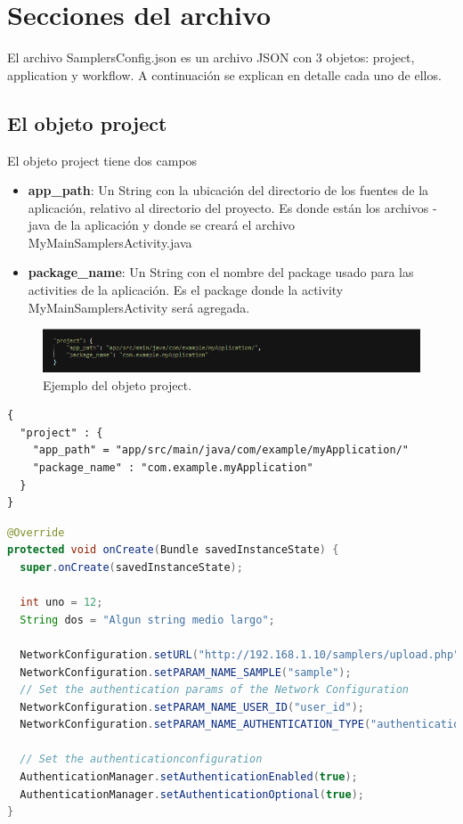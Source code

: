 \section{Secciones del archivo} \label{sec:archivo_config_detallado}

El archivo SamplersConfig.json es un archivo JSON con 3 objetos: project, application y workflow. A continuación se explican en detalle cada uno de ellos.

\subsection{El objeto project}
		
	El objeto project tiene dos campos
	\begin{itemize}
		\item \textbf{app\_path}: Un String con la ubicación del directorio de los fuentes de la aplicación, relativo al directorio del proyecto. Es donde están los archivos -java de la aplicación y donde se creará el archivo MyMainSamplersActivity.java
		\item \textbf{package\_name}: Un String con el nombre del package usado para las activities de la aplicación. Es el package donde la activity MyMainSamplersActivity será agregada.
	\end{itemize}
	
\begin{figure}[H]
  \centering
    \includegraphics[scale=0.6]{50-anexos/B-uso/json_project.png} 
    \caption{Ejemplo del objeto project.}
\end{figure}	

\begin{lstlisting}[language=XML, frame=tlbr, caption=Ejemplo del objeto project.]	
{
  "project" : {
    "app_path" = "app/src/main/java/com/example/myApplication/"
    "package_name" : "com.example.myApplication"
  }
}
\end{lstlisting}

\begin{lstlisting}[language=Java, frame=tlbr]	
@Override
protected void onCreate(Bundle savedInstanceState) {
  super.onCreate(savedInstanceState);
  
  int uno = 12;
  String dos = "Algun string medio largo";

  NetworkConfiguration.setURL("http://192.168.1.10/samplers/upload.php");
  NetworkConfiguration.setPARAM_NAME_SAMPLE("sample");
  // Set the authentication params of the Network Configuration
  NetworkConfiguration.setPARAM_NAME_USER_ID("user_id");
  NetworkConfiguration.setPARAM_NAME_AUTHENTICATION_TYPE("authentication_type");

  // Set the authenticationconfiguration
  AuthenticationManager.setAuthenticationEnabled(true);
  AuthenticationManager.setAuthenticationOptional(true);
}
\end{lstlisting}
	
